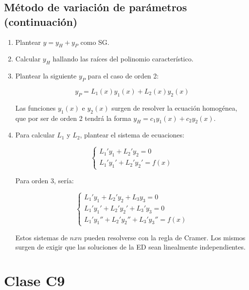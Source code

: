 \documentclass{article}
\begin{document}
\subsection{Método de variación de parámetros (continuación)}

\begin{enumerate}
\item Plantear $y = y_H + y_P$ como SG.
\item Calcular $y_H$ hallando las raíces del polinomio característico.
\item Plantear la siguiente $y_P$ para el caso de orden 2:

\begin{equation}
y_P = L_1(x) y_1(x) + L_2(x) y_2(x)
\end{equation}

Las funciones $y_1(x)$ e $y_2(x)$ surgen de resolver la ecuación homogénea, que por ser de orden 2 tendrá la forma $y_H = c_1 y_1(x) + c_2 y_2(x)$. 

\item Para calcular $L_1$ y $L_2$, plantear el sistema de ecuaciones:

\begin{equation}
\left\{
\begin{array}{ll}
L_1' y_1 + L_2' y_2 = 0 \\
L_1' y_1' + L_2' y_2' = f(x)
\end{array}
\right.
\end{equation}

Para orden 3, sería:

\begin{equation}
\left\{
\begin{array}{ll}
L_1' y_1 + L_2' y_2 + L_3 y_3 = 0 \\
L_1' y_1' + L_2' y_2' + L_3' y_3 = 0 \\
L_1' y_1'' + L_2' y_2'' + L_3' y_3'' = f(x)
\end{array}
\right.
\end{equation}

Estos sistemas de $nxn$ pueden resolverse con la regla de Cramer. Los mismos surgen de exigir que las soluciones de la ED sean linealmente independientes.

\end{enumerate}

\section{Clase C9}
\end{document}
